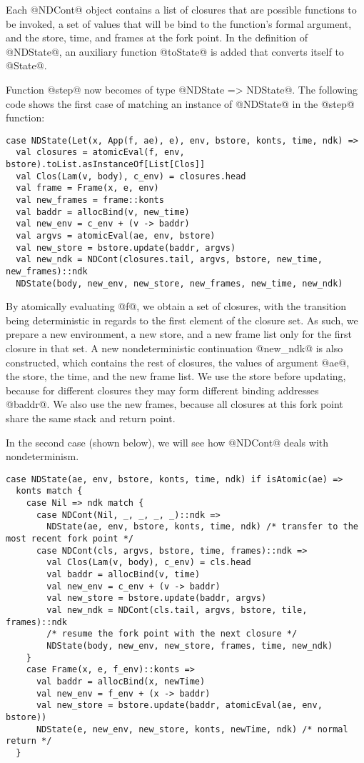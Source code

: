 \documentclass[acmsmall,review,anonymous]{acmart}\settopmatter{printfolios=true,printccs=false,printacmref=false}
\begin{document}
Each @NDCont@ object contains a list of closures that are possible functions to be invoked,
a set of values that will be bind to the function's formal argument,
and the store, time, and frames at the fork point.
In the definition of @NDState@, an auxiliary function @toState@ is added that
converts itself to @State@.

Function @step@ now becomes of type @NDState => NDState@.
The following code shows the first case of matching an instance of @NDState@ in
the @step@ function:

\begin{lstlisting}
case NDState(Let(x, App(f, ae), e), env, bstore, konts, time, ndk) =>
  val closures = atomicEval(f, env, bstore).toList.asInstanceOf[List[Clos]]
  val Clos(Lam(v, body), c_env) = closures.head
  val frame = Frame(x, e, env)
  val new_frames = frame::konts
  val baddr = allocBind(v, new_time)
  val new_env = c_env + (v -> baddr)
  val argvs = atomicEval(ae, env, bstore)
  val new_store = bstore.update(baddr, argvs)
  val new_ndk = NDCont(closures.tail, argvs, bstore, new_time, new_frames)::ndk
  NDState(body, new_env, new_store, new_frames, new_time, new_ndk)
\end{lstlisting}

By atomically evaluating @f@, we obtain a set of closures, with the transition being deterministic in regards to the first element of the closure set.
As such, we prepare a new environment, a new store, and a new frame list only for the
first closure in that set.
A new nondeterministic continuation @new_ndk@ is also constructed,
which contains the rest of closures, the values of argument @ae@, the store,
the time, and the new frame list.
We use the store before updating, because for different closures they may form
different binding addresses @baddr@.
We also use the new frames, because all closures at this fork point share
the same stack and return point.

In the second case (shown below), we will see how @NDCont@ deals with
nondeterminism.

\begin{lstlisting}
case NDState(ae, env, bstore, konts, time, ndk) if isAtomic(ae) =>
  konts match {
    case Nil => ndk match {
      case NDCont(Nil, _, _, _, _)::ndk =>
        NDState(ae, env, bstore, konts, time, ndk) /* transfer to the most recent fork point */
      case NDCont(cls, argvs, bstore, time, frames)::ndk =>
        val Clos(Lam(v, body), c_env) = cls.head
        val baddr = allocBind(v, time)
        val new_env = c_env + (v -> baddr)
        val new_store = bstore.update(baddr, argvs)
        val new_ndk = NDCont(cls.tail, argvs, bstore, tile, frames)::ndk
        /* resume the fork point with the next closure */
        NDState(body, new_env, new_store, frames, time, new_ndk)
    }
    case Frame(x, e, f_env)::konts =>
      val baddr = allocBind(x, newTime)
      val new_env = f_env + (x -> baddr)
      val new_store = bstore.update(baddr, atomicEval(ae, env, bstore))
      NDState(e, new_env, new_store, konts, newTime, ndk) /* normal return */
  }
\end{lstlisting}
\end{document}
